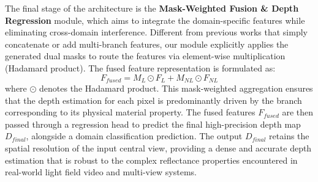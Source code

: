 \documentclass[lettersize,journal]{IEEEtran}
\begin{document}
The final stage of the architecture is the \textbf{Mask-Weighted Fusion \& Depth Regression} module, which aims to integrate the domain-specific features while eliminating cross-domain interference. Different from previous works that simply concatenate or add multi-branch features, our module explicitly applies the generated dual masks to route the features via element-wise multiplication (Hadamard product). The fused feature representation is formulated as:
\begin{equation}
F_{fused} = M_L \odot F_L + M_{NL} \odot F_{NL}
\end{equation}
where $\odot$ denotes the Hadamard product. This mask-weighted aggregation ensures that the depth estimation for each pixel is predominantly driven by the branch corresponding to its physical material property. The fused features $F_{fused}$ are then passed through a regression head to predict the final high-precision depth map $D_{final}$, alongside a domain classification prediction. The output $D_{final}$ retains the spatial resolution of the input central view, providing a dense and accurate depth estimation that is robust to the complex reflectance properties encountered in real-world light field video and multi-view systems.
\end{document}
